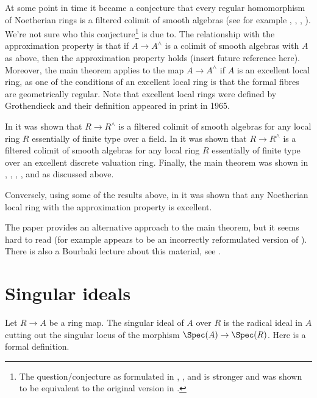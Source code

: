 \medskip\noindent
At some point in time it became a conjecture
that every regular homomorphism of Noetherian rings is a
filtered colimit of smooth algebras (see for example
\cite{Raynaud-Rennes}, \cite{popescu-global}, \cite{Artin-power-series},
\cite{Artin-Denef}). We're not sure who this conjecture\footnote{The
question/conjecture as formulated in \cite{Artin-power-series},
\cite{Artin-Denef}, and \cite{popescu-global} is stronger and was shown
to be equivalent to the original version in \cite{Cipu}.}
is due to. The relationship with the approximation property is that if
$A \to A^\wedge$ is a colimit of smooth algebras with $A$ as above,
then the approximation
property holds (insert future reference here). Moreover, the main theorem
applies to the map $A \to A^\wedge$ if $A$ is an excellent local ring, as one
of the conditions of an excellent local ring is that the formal
fibres are geometrically regular. Note that excellent local rings
were defined by Grothendieck and their definition appeared in
print in 1965.

\medskip\noindent
In \cite{Artin-power-series} it was shown that
$R \to R^\wedge$ is a filtered colimit of smooth algebras for any
local ring $R$ essentially of finite type over a field.
In \cite{Rotthaus-Artin} it was shown that $R \to R^\wedge$
is a filtered colimit of smooth algebras for any local ring $R$
essentially of finite type over an excellent discrete valuation ring.
Finally, the main theorem was shown in
\cite{popescu-GND}, \cite{popescu-GNDA}, \cite{popescu-letter},
\cite{Ogoma}, and \cite{swan} as discussed above.

\medskip\noindent
Conversely, using some of the results above, in \cite{Rotthaus-excellent}
it was shown that any Noetherian local ring with the approximation property
is excellent.

\medskip\noindent
The paper \cite{Spivakovsky} provides an alternative approach to the
main theorem, but it seems hard to read (for example
\cite[Lemma 5.2]{Spivakovsky} appears to be an incorrectly reformulated
version of \cite[Lemma 3]{Elkik}). There is also a Bourbaki
lecture about this material, see \cite{Teissier}.

\section{Singular ideals}
\label{smoothing-section-singular-ideal}
Let $R \to A$ be a ring map. The singular ideal of $A$ over $R$
is the radical ideal in $A$ cutting out the singular locus of the
morphism $\Spec(A) \to \Spec(R)$. Here is a formal definition.

